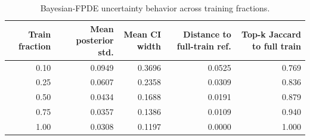 \begin{table}[t]
\centering
\caption{Bayesian-FPDE uncertainty behavior across training fractions.}
\label{tab:training_size}
\begin{tabular}{r r r r r}
        \hline
        Train fraction & Mean posterior std. & Mean CI width & Distance to full-train ref. & Top-k Jaccard to full train \\
        \hline
        0.10 & 0.0949 & 0.3696 & 0.0525 & 0.769 \\
        0.25 & 0.0607 & 0.2358 & 0.0309 & 0.836 \\
        0.50 & 0.0434 & 0.1688 & 0.0191 & 0.879 \\
        0.75 & 0.0357 & 0.1386 & 0.0109 & 0.940 \\
        1.00 & 0.0308 & 0.1197 & 0.0000 & 1.000 \\
        \hline
\end{tabular}
\end{table}

